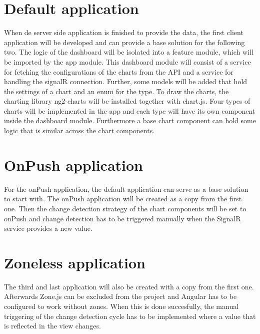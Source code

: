 \section{Default application}
When de server side application is finished to provide the data, the first client application will be developed and can provide a base solution for the following two. The logic of the dashboard will be isolated into a feature module, which will be imported by the app module. This dashboard module will consist of a service for fetching the configurations of the charts from the API and a service for handling the signalR connection. Further, some models will be added that hold the settings of a chart and an enum for the type. To draw the charts, the charting library ng2-charts will be installed together with chart.js. Four types of charts will be implemented in the app and each type will have its own component inside the dashboard module. Furthermore a base chart component can hold some logic that is similar across the chart components.

\section{OnPush application}
For the onPush application, the default application can serve as a base solution to start with. The onPush application will be created as a copy from the first one. Then the change detection strategy of the chart components will be set to onPush and change detection has to be triggered manually when the SignalR service provides a new value.

\section{Zoneless application}
The third and last application will also be created with a copy from the first one. Afterwards Zone.js can be excluded from the project and Angular has to be configured to work without zones. When this is done succesfully, the manual triggering of the change detection cycle has to be implemented where a value that is reflected in the view changes.
